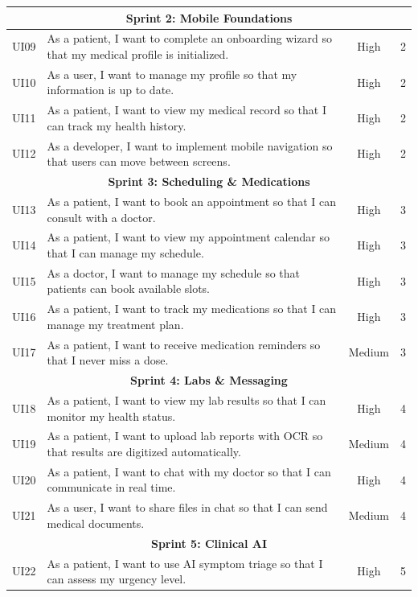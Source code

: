 \documentclass[12pt,a4paper,oneside]{report}
\begin{document}
\begin{longtable}{|c|p{7.5cm}|c|c|}
\hline
\multicolumn{4}{|c|}{\textbf{Sprint 2: Mobile Foundations}} \\
\hline
UI09 & As a patient, I want to complete an onboarding wizard so that my medical profile is initialized. & High & 2 \\
\hline
UI10 & As a user, I want to manage my profile so that my information is up to date. & High & 2 \\
\hline
UI11 & As a patient, I want to view my medical record so that I can track my health history. & High & 2 \\
\hline
UI12 & As a developer, I want to implement mobile navigation so that users can move between screens. & High & 2 \\
\hline
\multicolumn{4}{|c|}{\textbf{Sprint 3: Scheduling \& Medications}} \\
\hline
UI13 & As a patient, I want to book an appointment so that I can consult with a doctor. & High & 3 \\
\hline
UI14 & As a patient, I want to view my appointment calendar so that I can manage my schedule. & High & 3 \\
\hline
UI15 & As a doctor, I want to manage my schedule so that patients can book available slots. & High & 3 \\
\hline
UI16 & As a patient, I want to track my medications so that I can manage my treatment plan. & High & 3 \\
\hline
UI17 & As a patient, I want to receive medication reminders so that I never miss a dose. & Medium & 3 \\
\hline
\multicolumn{4}{|c|}{\textbf{Sprint 4: Labs \& Messaging}} \\
\hline
UI18 & As a patient, I want to view my lab results so that I can monitor my health status. & High & 4 \\
\hline
UI19 & As a patient, I want to upload lab reports with OCR so that results are digitized automatically. & Medium & 4 \\
\hline
UI20 & As a patient, I want to chat with my doctor so that I can communicate in real time. & High & 4 \\
\hline
UI21 & As a user, I want to share files in chat so that I can send medical documents. & Medium & 4 \\
\hline
\multicolumn{4}{|c|}{\textbf{Sprint 5: Clinical AI}} \\
\hline
UI22 & As a patient, I want to use AI symptom triage so that I can assess my urgency level. & High & 5 \\

\end{longtable}
\end{document}
